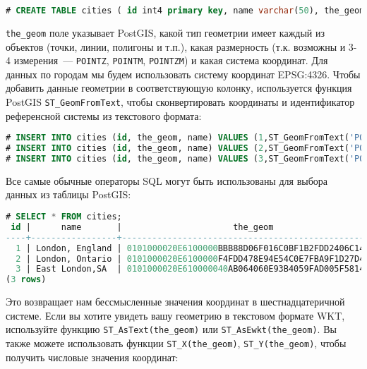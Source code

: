 \begin{lstlisting}[language=SQL,label=lst:postgiscreatecities,caption=Создание таблицы cities]
# CREATE TABLE cities ( id int4 primary key, name varchar(50), the_geom geometry(POINT,4326) );
\end{lstlisting}

\lstinline!the_geom! поле указывает PostGIS, какой тип геометрии имеет каждый из объектов (точки, линии, полигоны и т.п.), какая размерность (т.к. возможны и 3-4 измерения~--- \lstinline!POINTZ!, \lstinline!POINTM!, \lstinline!POINTZM!) и какая система координат. Для данных по городам мы будем использовать систему координат EPSG:4326. Чтобы добавить данные геометрии в соответствующую колонку, используется функция PostGIS \lstinline!ST_GeomFromText!, чтобы сконвертировать координаты и идентификатор референсной системы из текстового формата:

\begin{lstlisting}[language=SQL,label=lst:postgisinsertcities,caption=Заполнение таблицы cities]
# INSERT INTO cities (id, the_geom, name) VALUES (1,ST_GeomFromText('POINT(-0.1257 51.508)',4326),'London, England');
# INSERT INTO cities (id, the_geom, name) VALUES (2,ST_GeomFromText('POINT(-81.233 42.983)',4326),'London, Ontario');
# INSERT INTO cities (id, the_geom, name) VALUES (3,ST_GeomFromText('POINT(27.91162491 -33.01529)',4326),'East London,SA');
\end{lstlisting}

Все самые обычные операторы SQL могут быть использованы для выбора данных из таблицы PostGIS:

\begin{lstlisting}[language=SQL,label=lst:postgisselectcities,caption=SELECT cities]
# SELECT * FROM cities;
 id |      name       |                      the_geom
----+-----------------+----------------------------------------------------
  1 | London, England | 0101000020E6100000BBB88D06F016C0BF1B2FDD2406C14940
  2 | London, Ontario | 0101000020E6100000F4FDD478E94E54C0E7FBA9F1D27D4540
  3 | East London,SA  | 0101000020E610000040AB064060E93B4059FAD005F58140C0
(3 rows)
\end{lstlisting}

Это возвращает нам бессмысленные значения координат в шестнадцатеричной системе. Если вы хотите увидеть вашу геометрию в текстовом формате WKT, используйте функцию \lstinline!ST_AsText(the_geom)! или \lstinline!ST_AsEwkt(the_geom)!. Вы также можете использовать функции \lstinline!ST_X(the_geom)!, \lstinline!ST_Y(the_geom)!, чтобы получить числовые значения координат:

